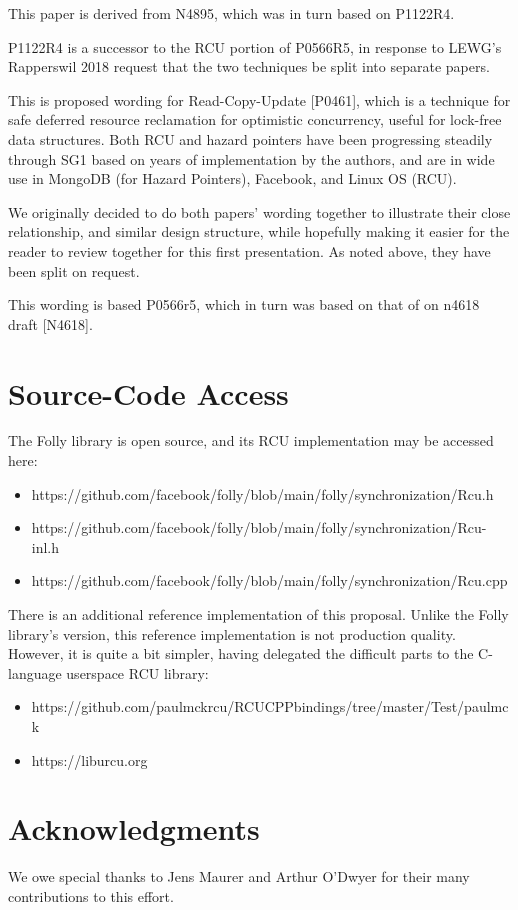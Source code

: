 This paper is derived from N4895, which was in turn based on P1122R4.

P1122R4 is a successor to the RCU portion of P0566R5, in response to
LEWG’s Rapperswil 2018 request that the two techniques be split into
separate papers.

This is proposed wording for Read-Copy-Update [P0461], which is
a technique for safe deferred resource reclamation for optimistic
concurrency, useful for lock-free data structures.
Both RCU and hazard pointers have been progressing steadily through SG1
based on years of implementation by the authors, and are in wide use in
MongoDB (for Hazard Pointers), Facebook, and Linux OS (RCU).

We originally decided to do both papers' wording together to illustrate
their close relationship, and similar design structure, while hopefully
making it easier for the reader to review together for this first
presentation.
As noted above, they have been split on request.

This wording is based P0566r5, which in turn was based on that of on
n4618 draft [N4618].

\section{Source-Code Access}
\label{sec:Source-Code Access}

The Folly library is open source, and its RCU implementation may be
accessed here:

\begin{itemize}
\item	https://github.com/facebook/folly/blob/main/folly/synchronization/Rcu.h
\item	https://github.com/facebook/folly/blob/main/folly/synchronization/Rcu-inl.h
\item	https://github.com/facebook/folly/blob/main/folly/synchronization/Rcu.cpp
\end{itemize}

There is an additional reference implementation of this proposal.
Unlike the Folly library's version, this reference implementation is
not production quality.
However, it is quite a bit simpler, having delegated the difficult parts
to the C-language userspace RCU library:

\begin{itemize}
\item	https://github.com/paulmckrcu/RCUCPPbindings/tree/master/Test/paulmck
\item	https://liburcu.org
\end{itemize}


\section{Acknowledgments}
\label{sec:Acknowledgments}

We owe special thanks to Jens Maurer and Arthur O'Dwyer for their many
contributions to this effort.
